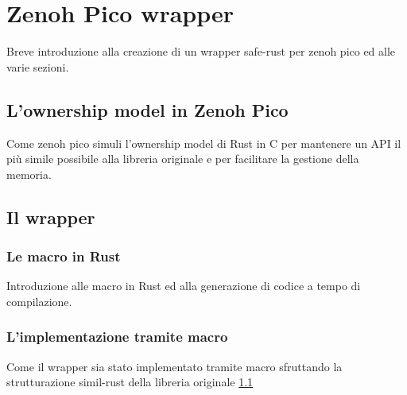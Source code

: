 \chapter{Zenoh Pico wrapper}
\label{chap:zenoh-pico-wrapper}

Breve introduzione alla creazione di un wrapper safe-rust per zenoh pico ed alle
varie sezioni.

\section{L'ownership model in Zenoh Pico}
\label{sec:ownership-model-in-zenoh-pico}

Come zenoh pico simuli l'ownership model di Rust in C per mantenere un API il più
simile possibile alla libreria originale e per facilitare la gestione della memoria.

\section{Il wrapper}
\label{sec:the-wrapper}

\subsection{Le macro in Rust}
\label{sec:macros-in-rust}

Introduzione alle macro in Rust ed alla generazione di codice a tempo di compilazione.

\subsection{L'implementazione tramite macro}
\label{sec:implementation-via-macros}

Come il wrapper sia stato implementato tramite macro sfruttando la strutturazione
simil-rust della libreria originale \cref{sec:ownership-model-in-zenoh-pico}
